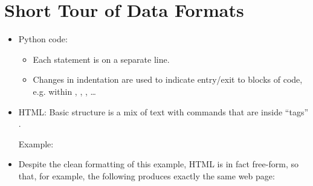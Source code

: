 \documentclass[letterpaper,10pt,english]{sphinxmanual}
\begin{document}
\section{Short Tour of Data Formats}
\label{\detokenize{lecture_notes/lec13_files_web:short-tour-of-data-formats}}\begin{itemize}
\item {} 
Python code:
\begin{itemize}
\item {} 
Each statement is on a separate line.

\item {} 
Changes in indentation are used to indicate entry/exit to blocks
of code, e.g. within , , , …

\end{itemize}

\item {} 
HTML: Basic structure is a mix of text with commands that are
inside “tags”  .

Example:

\begin{sphinxVerbatim}[commandchars=\\\{\}]
         
            
           
\end{sphinxVerbatim}

\item {} 
Despite the clean formatting of this example, HTML is in fact
free-form, so that, for example, the following produces exactly the
same web page:


\end{itemize}
\end{document}

